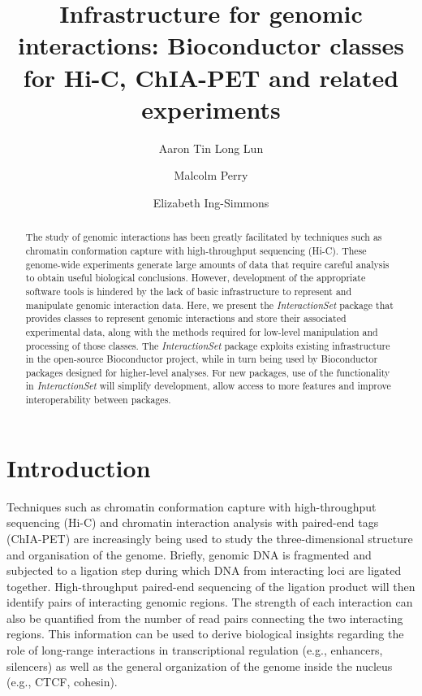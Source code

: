\documentclass[10pt,a4paper,twocolumn]{article}
\begin{document}
\title{Infrastructure for genomic interactions: Bioconductor classes for Hi-C, ChIA-PET and related experiments}

\author[1]{Aaron Tin Long Lun}
\author[2]{Malcolm Perry}
\author[2]{Elizabeth Ing-Simmons}

\maketitle
\thispagestyle{fancy}

\begin{abstract}
The study of genomic interactions has been greatly facilitated by techniques such as chromatin conformation capture with high-throughput sequencing (Hi-C).
These genome-wide experiments generate large amounts of data that require careful analysis to obtain useful biological conclusions.
However, development of the appropriate software tools is hindered by the lack of basic infrastructure to represent and manipulate genomic interaction data.
Here, we present the \textit{InteractionSet} package that provides classes to represent genomic interactions and store their associated experimental data, along with the methods required for low-level manipulation and processing of those classes.
The \textit{InteractionSet} package exploits existing infrastructure in the open-source Bioconductor project, while in turn being used by Bioconductor packages designed for higher-level analyses.
For new packages, use of the functionality in \textit{InteractionSet} will simplify development, allow access to more features and improve interoperability between packages.
\end{abstract}

\clearpage
\newcommand{\code}[1]{{\small\texttt{#1}}}

\section*{Introduction}
Techniques such as chromatin conformation capture with high-throughput sequencing (Hi-C) \cite{aiden2009comprehensive} and chromatin interaction analysis with paired-end tags (ChIA-PET) \cite{fullwood2009oestrogen} are increasingly being used to study the three-dimensional structure and organisation of the genome.
Briefly, genomic DNA is fragmented and subjected to a ligation step during which DNA from interacting loci are ligated together.
High-throughput paired-end sequencing of the ligation product will then identify pairs of interacting genomic regions.
The strength of each interaction can also be quantified from the number of read pairs connecting the two interacting regions.
This information can be used to derive biological insights regarding the role of long-range interactions in transcriptional regulation (e.g., enhancers, silencers) as well as the general organization of the genome inside the nucleus (e.g., CTCF, cohesin).
\end{document}
